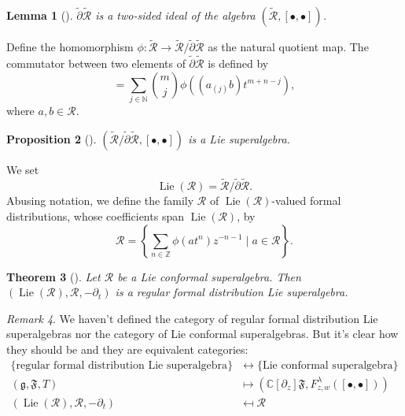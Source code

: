 \documentclass[a4paper, 12pt, reqno]{amsart}
\newtheorem{theorem}{Theorem}[section]
\newtheorem{lemma}[theorem]{Lemma}
\newtheorem{proposition}[theorem]{Proposition}
\theoremstyle{remark}
\newtheorem{remark}[theorem]{Remark}
\numberwithin{equation}{subsection}
\DeclareMathOperator{\Lie}{Lie}
\begin{document}
\begin{lemma}[{\cite[Proposition 2.6.1]{nozaradan_introduction_2008}}]
  \label{lmm:1}
  $\widetilde{\partial}\widetilde{\mathcal{R}}$ is a two-sided ideal of the algebra $(\widetilde{\mathcal{R}}, [\bullet, \bullet])$.
\end{lemma}

Define the homomorphism $\phi: \widetilde{\mathcal{R}} \to \widetilde{\mathcal{R}}/\widetilde{\partial}\widetilde{\mathcal{R}}$ as the natural quotient map.
The commutator between two elements of $\widetilde{\partial}\widetilde{\mathcal{R}}$ is defined by
\begin{equation}
  [\phi(at^m), \phi(bt^n)] = \sum_{j \in \mathbb{N}}\binom{m}{j}\phi((a_{(j)}b)t^{m + n - j}),
\end{equation}
where $a, b \in \mathcal{R}$.

\begin{proposition}[{\cite[Proposition 2.6.3]{nozaradan_introduction_2008}}]
  \label{prp:4}
  $(\widetilde{\mathcal{R}}/\widetilde{\partial}\widetilde{\mathcal{R}}, [\bullet, \bullet])$ is a Lie superalgebra.
\end{proposition}

We set
\begin{equation*}
  \Lie(\mathcal{R}) = \widetilde{\mathcal{R}}/\widetilde{\partial}\widetilde{\mathcal{R}}.
\end{equation*}
Abusing notation, we define the family $\mathcal{R}$ of $\Lie(\mathcal{R})$-valued formal distributions, whose coefficients span $\Lie(\mathcal{R})$, by
\begin{equation*}
  \mathcal{R} = \left\{\sum_{n \in \mathbb{Z}}\phi(at^n)z^{-n - 1} \mid a \in \mathcal{R}\right\}.
\end{equation*}

\begin{theorem}[{\cite[Proposition 2.6.4]{nozaradan_introduction_2008}}]
  \label{thr:10}
  Let $\mathcal{R}$ be a Lie conformal superalgebra.
  Then $(\Lie(\mathcal{R}), \mathcal{R},-\partial_t)$ is a regular formal distribution Lie superalgebra. 
\end{theorem}

\begin{remark}
  \label{rmk:5}
  We haven't defined the category of regular formal distribution Lie superalgebras nor the category of Lie conformal superalgebras.
  But it's clear how they should be and they are equivalent categories:
  \begin{align*}
    \{\text{regular formal distribution Lie superalgebra}\} &\leftrightarrow \{\text{Lie conformal superalgebra}\} \\
    (\mathfrak{g}, \mathfrak{F}, T) &\mapsto (\mathbb{C}[\partial_z]\mathfrak{F}, F^{\lambda}_{z, w}([\bullet, \bullet])) \\
    (\Lie(\mathcal{R}), \mathcal{R},-\partial_t) &\mapsfrom \mathcal{R}
  \end{align*}
\end{remark}
\end{document}
